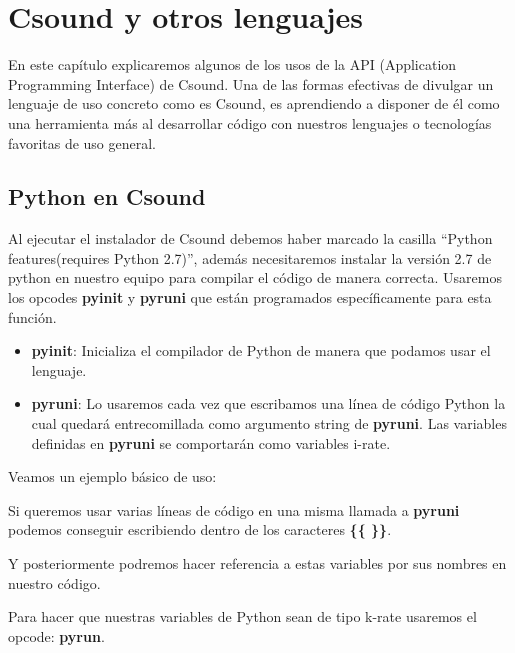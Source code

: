 
\chapter{Csound y otros lenguajes}

En este capítulo explicaremos algunos de los usos de la API (Application Programming Interface) de Csound. Una de las formas efectivas de divulgar un lenguaje de uso concreto como es Csound, es aprendiendo a disponer de él como una herramienta más al desarrollar código con nuestros lenguajes o tecnologías favoritas de uso general.

\section{Python en  Csound}

Al ejecutar el instalador de Csound debemos haber marcado la casilla ``Python features(requires Python 2.7)'', además necesitaremos instalar la versión 2.7 de python en nuestro equipo para compilar el código de manera correcta. Usaremos los opcodes \textbf{pyinit} y \textbf{pyruni} que están programados específicamente para esta función.

\begin{itemize}
 \item \textbf{pyinit}: Inicializa el compilador de Python de manera que podamos usar el lenguaje.
 \item \textbf{pyruni}: Lo usaremos cada vez que escribamos una línea de código Python la cual quedará entrecomillada como argumento string de \textbf{pyruni}. Las variables definidas en \textbf{pyruni} se comportarán como variables i-rate.
\end{itemize}

Veamos un ejemplo básico de uso:


Si queremos usar varias líneas de código en una misma llamada a \textbf{pyruni} podemos conseguir escribiendo dentro de los caracteres \textbf{\{\{ \}\}}.


Y posteriormente podremos hacer referencia a estas variables por sus nombres en nuestro código.

Para hacer que nuestras variables de Python sean de tipo k-rate usaremos el opcode: \textbf{pyrun}.

